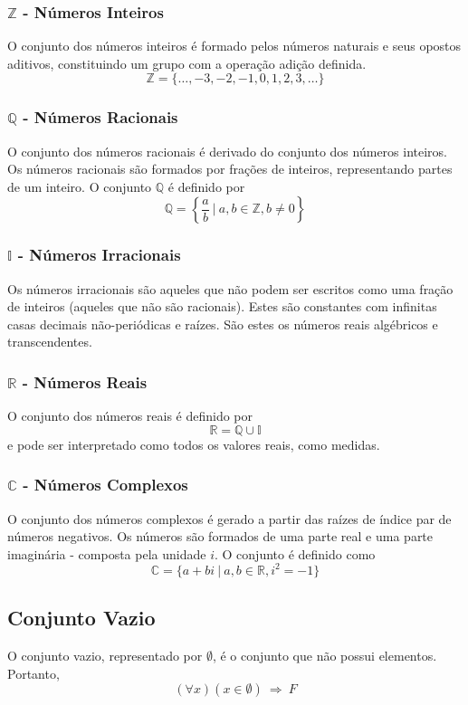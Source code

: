 \subsubsection{$\mathbb{Z}$ - Números Inteiros}
O conjunto dos números inteiros é formado pelos números naturais e seus opostos aditivos, constituindo um grupo com a operação adição definida. \[\mathbb{Z}=\{\dots, -3, -2, -1, 0, 1, 2, 3, \dots\}\]

\subsubsection{$\mathbb{Q}$ - Números Racionais}
O conjunto dos números racionais é derivado do conjunto dos números inteiros. Os números racionais são formados por frações de inteiros, representando partes de um inteiro. O conjunto $\mathbb{Q}$ é definido por \[\mathbb{Q}=\left\lbrace \frac{a}{b} \: | \: a,b \in \mathbb{Z}, b \neq 0 \right\rbrace\]

\subsubsection{$\mathbb{I}$ - Números Irracionais}
Os números irracionais são aqueles que não podem ser escritos como uma fração de inteiros (aqueles que não são racionais). Estes são constantes com infinitas casas decimais não-periódicas e raízes. São estes os números reais algébricos e transcendentes.
\subsubsection{$\mathbb{R}$ - Números Reais}
O conjunto dos números reais é definido por \[\mathbb{R}=\mathbb{Q} \cup \mathbb{I}\] e pode ser interpretado como todos os valores reais, como medidas.

\subsubsection{$\mathbb{C}$ - Números Complexos}
O conjunto dos números complexos é gerado a partir das raízes de índice par de números negativos. Os números são formados de uma parte real e uma parte imaginária - composta pela unidade $i$. O conjunto é definido como \[\mathbb{C}=\{a+bi \ | \ a,b \in \mathbb{R}, i^2=-1\}\]

\subsection{Conjunto Vazio}
O conjunto vazio, representado por $\emptyset$, é o conjunto que não possui elementos. Portanto, \[(\forall x)(x \in \emptyset) \: \Rightarrow \: F\]

